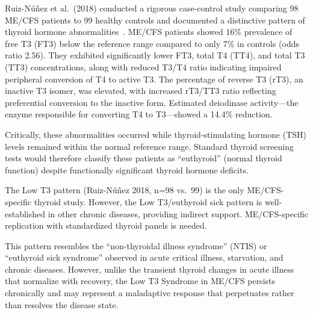 \begin{achievement}
\label{ach:low-t3}
Ruiz-Núñez et al.\ (2018) conducted a rigorous case-control study comparing 98 ME/CFS patients to 99 healthy controls and documented a distinctive pattern of thyroid hormone abnormalities~\cite{ruiznunez2018thyroid}. ME/CFS patients showed 16\% prevalence of free T3 (FT3) below the reference range compared to only 7\% in controls (odds ratio 2.56). They exhibited significantly lower FT3, total T4 (TT4), and total T3 (TT3) concentrations, along with reduced T3/T4 ratio indicating impaired peripheral conversion of T4 to active T3. The percentage of reverse T3 (rT3), an inactive T3 isomer, was elevated, with increased rT3/TT3 ratio reflecting preferential conversion to the inactive form. Estimated deiodinase activity---the enzyme responsible for converting T4 to T3---showed a 14.4\% reduction.

Critically, these abnormalities occurred while thyroid-stimulating hormone (TSH) levels remained within the normal reference range. Standard thyroid screening tests would therefore classify these patients as ``euthyroid'' (normal thyroid function) despite functionally significant thyroid hormone deficits.
\end{achievement}

\begin{warning}
The Low T3 pattern (Ruiz-Núñez 2018, n=98 vs.\ 99) is the only ME/CFS-specific thyroid study. However, the Low T3/euthyroid sick pattern is well-established in other chronic diseases, providing indirect support. ME/CFS-specific replication with standardized thyroid panels is needed.
\end{warning}

This pattern resembles the ``non-thyroidal illness syndrome'' (NTIS) or ``euthyroid sick syndrome'' observed in acute critical illness, starvation, and chronic diseases. However, unlike the transient thyroid changes in acute illness that normalize with recovery, the Low T3 Syndrome in ME/CFS persists chronically and may represent a maladaptive response that perpetuates rather than resolves the disease state.

